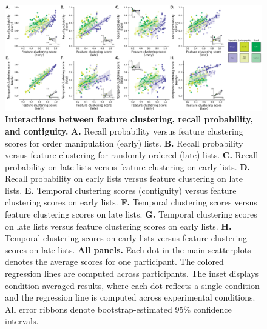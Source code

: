 \documentclass[11pt]{article}
\begin{document}
\begin{figure}[tp] \centering
    \includegraphics[width=\textwidth]{figures/feature_clustering_vs_accuracy_and_contiguity}
    
    \caption{\textbf{Interactions between feature clustering, recall probability,
    and contiguity.} \textbf{A.} Recall probability versus feature clustering
    scores for order manipulation (early) lists. \textbf{B.} Recall probability
    versus feature clustering for randomly ordered (late) lists. \textbf{C.} Recall
    probability on late lists versus feature clustering on early lists. \textbf{D.}
    Recall probability on early lists versus feature clustering on late lists.
    \textbf{E.} Temporal clustering scores (contiguity) versus feature clustering
    scores on early lists. \textbf{F.} Temporal clustering scores versus feature
    clustering scores on late lists. \textbf{G.} Temporal clustering scores on late
    lists versus feature clustering scores on early lists. \textbf{H.} Temporal
    clustering scores on early lists versus feature clustering scores on late
    lists. \textbf{All panels.} Each dot in the main scatterplots denotes the
    average scores for one participant. The colored regression lines are computed
    across participants. The inset displays condition-averaged results, where each
    dot reflects a single condition and the regression line is computed across
    experimental conditions. All error ribbons denote bootstrap-estimated 95\%
    confidence intervals.} \label{fig:clustering-scatterplots} 
    
\end{figure}
\end{document}
